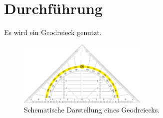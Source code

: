 \section{Durchführung}
\label{sec:durchführung}

Es wird ein Geodreieck genutzt.

\begin{figure}
	\label{fig:geodreieck}
	\centering
	\includegraphics[width=0.55\textwidth]{content/geodreieck.pdf}
	\caption{Schematische Darstellung eines Geodreiecks.}
\end{figure}
